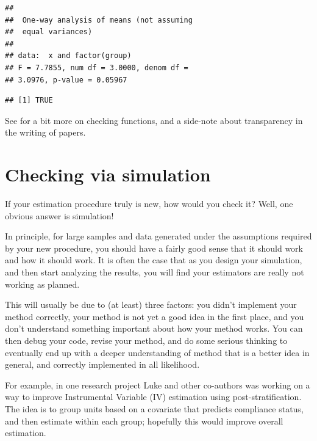 \documentclass[
]{book}
\newenvironment{Shaded}{\begin{snugshade}}{\end{snugshade}}
\newcommand{\FunctionTok}[1]{\textcolor[rgb]{0.00,0.00,0.00}{#1}}
\newcommand{\NormalTok}[1]{#1}
\newcommand{\OtherTok}[1]{\textcolor[rgb]{0.56,0.35,0.01}{#1}}
\newcommand{\SpecialCharTok}[1]{\textcolor[rgb]{0.00,0.00,0.00}{#1}}
\begin{document}
\begin{verbatim}
## 
##  One-way analysis of means (not assuming
##  equal variances)
## 
## data:  x and factor(group)
## F = 7.7855, num df = 3.0000, denom df =
## 3.0976, p-value = 0.05967
\end{verbatim}

\begin{Shaded}
\end{Shaded}

\begin{verbatim}
## [1] TRUE
\end{verbatim}

See \citet{sec_comp_efficiency} for a bit more on checking functions, and a side-note about transparency in the writing of papers.

\hypertarget{checking-via-simulation}{%
\section{Checking via simulation}\label{checking-via-simulation}}

If your estimation procedure truly is new, how would you check it?
Well, one obvious answer is simulation!

In principle, for large samples and data generated under the assumptions required by your new procedure, you should have a fairly good sense that it should work and how it should work.
It is often the case that as you design your simulation, and then start analyzing the results, you will find your estimators are really not working as planned.

This will usually be due to (at least) three factors: you didn't implement your method correctly, your method is not yet a good idea in the first place, and you don't understand something important about how your method works.
You can then debug your code, revise your method, and do some serious thinking to eventually end up with a deeper understanding of method that is a better idea in general, and correctly implemented in all likelihood.

For example, in one research project Luke and other co-authors was working on a way to improve Instrumental Variable (IV) estimation using post-stratification.
The idea is to group units based on a covariate that predicts compliance status, and then estimate within each group; hopefully this would improve overall estimation.
\end{document}
